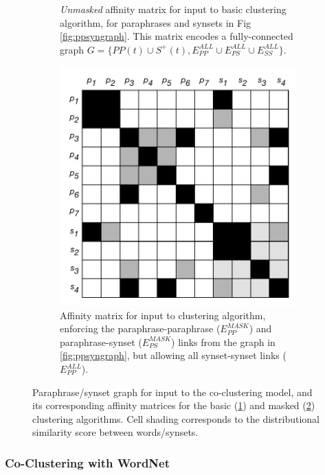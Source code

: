 \documentclass[11pt]{article}
\begin{document}
\begin{figure}[th]
\begin{subfigure}[t]{0.36\textwidth}
			\caption{\textit{Unmasked} affinity matrix for input to basic clustering algorithm, for paraphrases and synsets in Fig \ref{fig:ppsyngraph}. This matrix encodes a fully-connected graph $G = \{PP(t) \cup S^+(t), E_{PP}^{ALL} \cup E_{PS}^{ALL} \cup E_{SS}^{ALL} \}$.}
			\label{fig:ppsynmatall}
		\end{subfigure}
		\hfill%
		\begin{subfigure}[t]{0.36\textwidth}
			\includegraphics[width=\textwidth]{images/pp_syn_mat_mask.pdf}
			\caption{Affinity matrix for input to clustering algorithm, enforcing the paraphrase-paraphrase ($E_{PP}^{MASK}$) and paraphrase-synset ($E_{PS}^{MASK}$) links from the graph in \ref{fig:ppsyngraph}, but allowing all synset-synset links ($E_{PP}^{ALL}$). }
			\label{fig:ppsynmatmask}
		\end{subfigure}
		\caption{Paraphrase/synset graph for input to the co-clustering model, and its corresponding affinity matrices for the basic (\ref{fig:ppsynmatall}) and masked (\ref{fig:ppsynmatmask}) clustering algorithms. Cell shading corresponds to the distributional similarity score between words/synsets. }
		\label{fig:cocluster}
	\end{figure}
	
	
	\subsubsection{Co-Clustering with WordNet}
	
\end{document}
